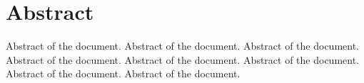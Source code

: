 \cleardoublepage

{ %
\section*{Abstract}

\noindent  Abstract of the document. Abstract of the document. Abstract of the document. 
Abstract of the document. Abstract of the document. Abstract of the document. 
Abstract of the document. Abstract of the document.

\lipsum[1-3]

\thispagestyle{myplain}}